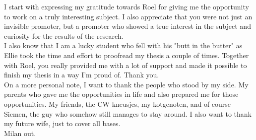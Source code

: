 \documentclass[master=ecws,masteroption=ai]{kulemt}
\begin{document}
\begin{preface}
 
I start with expressing my gratitude towards Roel for giving me the opportunity to work on a truly interesting subject. I also appreciate that you were not just an invisible promoter, but a promoter who showed a true interest in the subject and curiosity for the results of the research. \\
I also know that I am a lucky student who fell with his "butt in the butter" as Ellie took the time and effort to proofread my thesis a couple of times. Together with Roel, you really provided me with a lot of support and made it possible to finish my thesis in a way I'm proud of. Thank you. \\
On a  more personal note, I want to thank the people who stood by my side. My parents who gave me the opportunities in life and also prepared me for those opportunities. My friends, the CW kneusjes, my kotgenoten, and of course Siemen, the guy who somehow still manages to stay around. I also want to thank my future wife, just to cover all bases. \\

\noindent Milan out.
 
\end{preface}

\tableofcontents*
\end{document}

